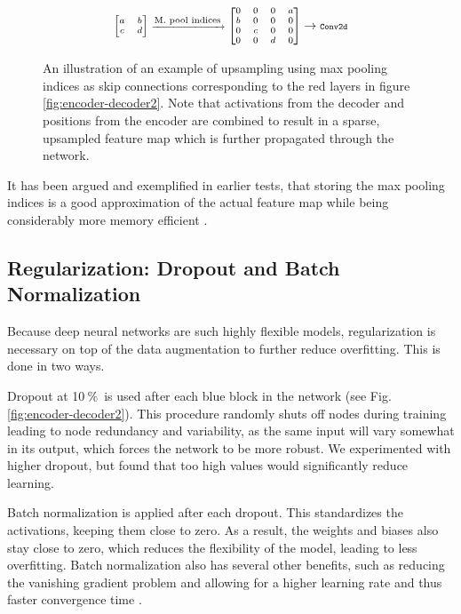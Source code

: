 \documentclass{article}
\newcommand{\pro}{\ensuremath{\ \%}}
\begin{document}
 \begin{figure}[htb!]
 	\begin{equation*}\label{key}
\scriptsize
\begin{bmatrix}a&b\\c&d\end{bmatrix} \xrightarrow{\text{\scriptsize M. pool indices}}
\begin{bmatrix}0&0&0&a\\b&0&0&0\\0&c&0&0\\0&0&d&0\end{bmatrix} 
\rightarrow 
\texttt{\scriptsize Conv2d}
\end{equation*}
 	\caption{An illustration of an example of upsampling using max pooling indices as skip connections corresponding to the red layers in figure \ref{fig:encoder-decoder2}. Note that activations from the decoder and positions from the encoder are combined to result in a sparse, upsampled feature map which is further propagated through the network.}
\end{figure}
\noindent 
It has been argued and exemplified in earlier tests, that storing the max pooling indices is a good approximation of the actual feature map  while being considerably more memory efficient \cite{seg}. 



\subsection{Regularization: Dropout and Batch Normalization}
Because deep neural networks are such highly flexible models, regularization is necessary on top of the data augmentation to further reduce overfitting.
This is done in two ways.

Dropout at 10\pro\ is used after each blue block in the network (see Fig. \ref{fig:encoder-decoder2}).
This procedure randomly shuts off nodes during training leading to node redundancy and variability, as the same input will vary somewhat in its output, which forces the network to be more robust.
We experimented with higher dropout, but found that too high values would significantly reduce learning.

Batch normalization is applied after each dropout.
This standardizes the activations, keeping them close to zero.
As a result, the weights and biases also stay close to zero, which reduces the flexibility of the model, leading to less overfitting.
Batch normalization also has several other benefits, such as reducing the vanishing gradient problem and allowing for a higher learning rate and thus faster convergence time \cite{bn}. 
\end{document}
